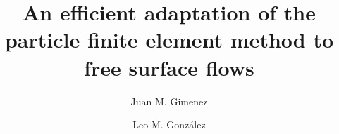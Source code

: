 \documentclass[review]{elsarticle}
\begin{document}
\begin{frontmatter}

\title{An efficient adaptation of the particle finite element method to free surface flows}


\author[mymainaddress]{Juan M. Gimenez}
\author[mysecondaryaddress]{Leo M. Gonz\'{a}lez}
\address[mymainaddress]{Centro de Investigaci\'on de M\'etodos Computacionales (CIMEC) - UNL/CONICET, Predio Conicet-Santa Fe Colectora Ruta Nac 168
	      Paraje El Pozo, Santa Fe, Argentina.}
\address[mysecondaryaddress]{Escuela T\'{e}cnica Superior de Ingenieros Navales, Universidad Polit\'{e}cnica de Madrid (ETSIN-UPM), Avd. Arco de la Victoria 4, Madrid, Spain}


\end{frontmatter}
\end{document}
